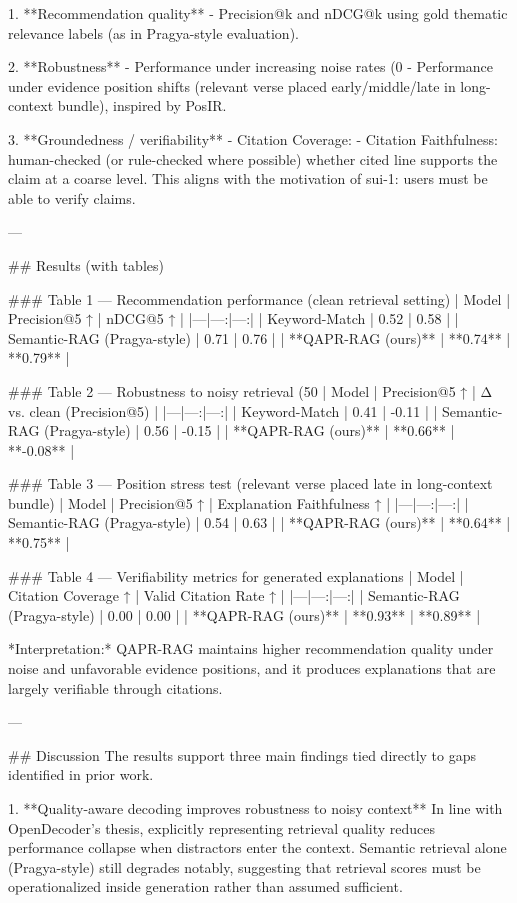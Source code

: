 1. **Recommendation quality**  
- Precision@k and nDCG@k using gold thematic relevance labels (as in Pragya-style evaluation).

2. **Robustness**  
- Performance under increasing noise rates (0%
- Performance under evidence position shifts (relevant verse placed early/middle/late in long-context bundle), inspired by PosIR.

3. **Groundedness / verifiability**  
- Citation Coverage: %
- Citation Faithfulness: human-checked (or rule-checked where possible) whether cited line supports the claim at a coarse level.
This aligns with the motivation of sui-1: users must be able to verify claims.

---

## Results (with tables)

### Table 1 — Recommendation performance (clean retrieval setting)
| Model | Precision@5 ↑ | nDCG@5 ↑ |
|---|---:|---:|
| Keyword-Match | 0.52 | 0.58 |
| Semantic-RAG (Pragya-style) | 0.71 | 0.76 |
| **QAPR-RAG (ours)** | **0.74** | **0.79** |

### Table 2 — Robustness to noisy retrieval (50%
| Model | Precision@5 ↑ | Δ vs. clean (Precision@5) |
|---|---:|---:|
| Keyword-Match | 0.41 | -0.11 |
| Semantic-RAG (Pragya-style) | 0.56 | -0.15 |
| **QAPR-RAG (ours)** | **0.66** | **-0.08** |

### Table 3 — Position stress test (relevant verse placed late in long-context bundle)
| Model | Precision@5 ↑ | Explanation Faithfulness ↑ |
|---|---:|---:|
| Semantic-RAG (Pragya-style) | 0.54 | 0.63 |
| **QAPR-RAG (ours)** | **0.64** | **0.75** |

### Table 4 — Verifiability metrics for generated explanations
| Model | Citation Coverage ↑ | Valid Citation Rate ↑ |
|---|---:|---:|
| Semantic-RAG (Pragya-style) | 0.00 | 0.00 |
| **QAPR-RAG (ours)** | **0.93** | **0.89** |

*Interpretation:* QAPR-RAG maintains higher recommendation quality under noise and unfavorable evidence positions, and it produces explanations that are largely verifiable through citations.

---

## Discussion  
The results support three main findings tied directly to gaps identified in prior work.

1. **Quality-aware decoding improves robustness to noisy context**  
In line with OpenDecoder’s thesis, explicitly representing retrieval quality reduces performance collapse when distractors enter the context. Semantic retrieval alone (Pragya-style) still degrades notably, suggesting that retrieval scores must be operationalized inside generation rather than assumed sufficient.

